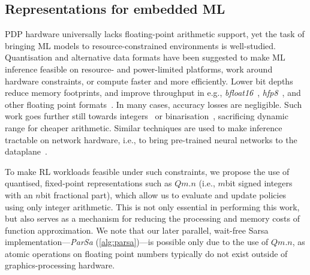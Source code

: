\documentclass[
conference
,10pt
]{IEEEtran}
\begin{document}
\subsection{Representations for embedded ML}
PDP hardware universally lacks floating-point arithmetic support, yet the task of bringing ML models to resource-constrained environments is well-studied.
Quantisation and alternative data formats have been suggested to make ML inference feasible on resource- and power-limited platforms, work around hardware constraints, or compute faster and more efficiently.
Lower bit depths reduce memory footprints, and improve throughput in e.g., \emph{bfloat16}~\parencite{bfloat16-blog,DBLP:journals/sigops/XieDMKVZT18}, \emph{hfp8}~\parencite{DBLP:conf/nips/SunCCWVSCZG19}, and other floating point formats~\parencite{DBLP:journals/corr/abs-2007-01530}.
In many cases, accuracy losses are negligible.
Such work goes further still towards integers~\parencite{tensorrt-8bit} or binarisation~\parencite{DBLP:journals/corr/MiyashitaLM16,DBLP:conf/eccv/RastegariORF16,DBLP:journals/corr/KimS16,DBLP:conf/nips/HubaraCSEB16}, sacrificing dynamic range for cheaper arithmetic.
Similar techniques are used to make inference tractable on network hardware, i.e., to bring pre-trained neural networks to the dataplane~\parencite{DBLP:journals/corr/abs-2009-02353,DBLP:conf/sigcomm/SanvitoSB18,DBLP:journals/corr/abs-1801-05731}.

To make RL workloads feasible under such constraints, we propose the use of quantised, fixed-point representations such as $Qm.n$ (i.e., $m$\si{bit} signed integers with an $n$\si{bit} fractional part), which allow us to evaluate and update policies using only integer arithmetic.
This is not only essential in performing this work, but also serves as a mechanism for reducing the processing and memory costs of function approximation.
We note that our later parallel, wait-free Sarsa implementation---\emph{ParSa} (\cref{alg:parsa})---is possible only due to the use of $Qm.n$, as atomic operations on floating point numbers typically do not exist outside of graphics-processing hardware.

\end{document}
